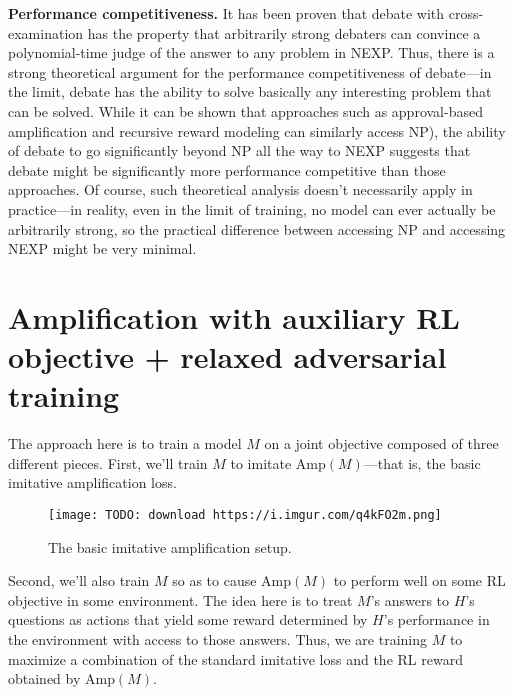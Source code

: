 \textbf{Performance competitiveness.} It has been proven\cite{TODO: cite https://www.alignmentforum.org/posts/Br4xDbYu4Frwrb64a/writeup-progress-on-ai-safety-via-debate-1} that debate with cross-examination has the property that arbitrarily strong debaters can convince a polynomial-time judge of the answer to any problem in NEXP\cite{TODO: cite https://en.wikipedia.org/wiki/NEXPTIME}. Thus, there is a strong theoretical argument for the performance competitiveness of debate---in the limit, debate has the ability to solve basically any interesting problem that can be solved. While it can be shown that approaches such as approval-based amplification and recursive reward modeling can similarly access NP\cite{TODO: cite https://en.wikipedia.org/wiki/NP_(complexity}), the ability of debate to go significantly beyond NP all the way to NEXP suggests that debate might be significantly more performance competitive than those approaches. Of course, such theoretical analysis doesn't necessarily apply in practice---in reality, even in the limit of training, no model can ever actually be arbitrarily strong, so the practical difference between accessing NP and accessing NEXP might be very minimal.

\section{Amplification with auxiliary RL objective + relaxed adversarial training}
\label{sec:10}

The approach here is to train a model $M$ on a joint objective composed of three different pieces. First, we'll train $M$ to imitate $\text{Amp}(M)$---that is, the basic imitative amplification loss.

\begin{figure}[h!]
  \centering
  \texttt{[image: TODO: download https://i.imgur.com/q4kFO2m.png]}
  \caption{The basic imitative amplification setup.}
\end{figure}

Second, we'll also train $M$ so as to cause $\text{Amp}(M)$ to perform well on some RL objective in some environment. The idea here is to treat $M$'s answers to $H$'s questions as actions that yield some reward determined by $H$'s performance in the environment with access to those answers. Thus, we are training $M$ to maximize a combination of the standard imitative loss and the RL reward obtained by $\text{Amp}(M)$.

